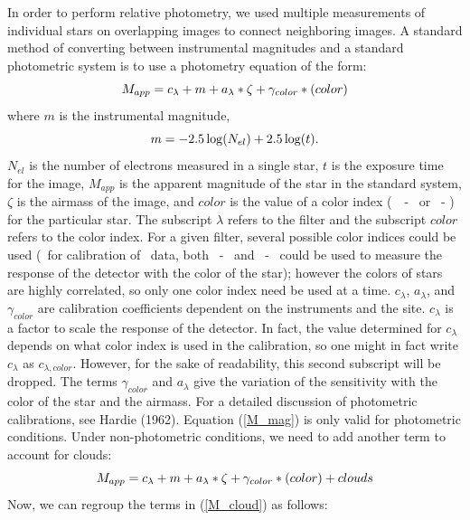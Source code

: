 \documentclass{article}
\begin{document}
        In order to perform relative photometry, we used multiple
measurements of individual stars on overlapping images to connect
neighboring images.  A standard method of converting between
instrumental magnitudes and a standard photometric system is to use a
photometry equation of the form:
\begin{equation}        
M_{app} = c_{\lambda} + m + a_{\lambda}*\zeta + \gamma_{color}*(color) \\
\label{M_mag}
\end{equation}
where $m$ is the instrumental magnitude,
\begin{equation}        
m = -2.5\log(N_{el}) + 2.5\log(t). \\
\label{inst_mag}
\end{equation}
$N_{el}$ is the number of electrons measured in a single star, $t$ is
the exposure time for the image, $M_{app}$ is the apparent magnitude
of the star in the standard system, $\zeta$ is the airmass of the
image, and $color$ is the value of a color index (\ie\ \B\ - \V\ or
\V\ - \R) for the particular star.  The subscript $\lambda$ refers to
the filter and the subscript $color$ refers to the color index.  For a
given filter, several possible color indices could be used (\ie\, for
calibration of \V\ data, both \B\ - \V\ and \V\ - \R\ could be used to
measure the response of the detector with the color of the star);
however the colors of stars are highly correlated, so only one color
index need be used at a time.  $c_{\lambda}$, $a_{\lambda}$, and
$\gamma_{color}$ are calibration coefficients dependent on the
instruments and the site.  $c_{\lambda}$ is a factor to scale the
response of the detector.  In fact, the value determined for
$c_{\lambda}$ depends on what color index is used in the calibration,
so one might in fact write $c_{\lambda}$ as $c_{\lambda, color}$.
However, for the sake of readability, this second subscript will be
dropped.  The terms $\gamma_{color}$ and $a_{\lambda}$ give the
variation of the sensitivity with the color of the star and the
airmass.  For a detailed discussion of photometric calibrations, see
Hardie (1962).  Equation (\ref{M_mag}) is only valid for photometric
conditions.  Under non-photometric conditions, we need to add another
term to account for clouds:
\begin{equation}        
M_{app} = c_{\lambda} + m + a_{\lambda}*\zeta + \gamma_{color}*(color) + clouds \\
\label{M_cloud}
\end{equation}
Now, we can regroup the terms in (\ref{M_cloud}) as follows:
\end{document}
